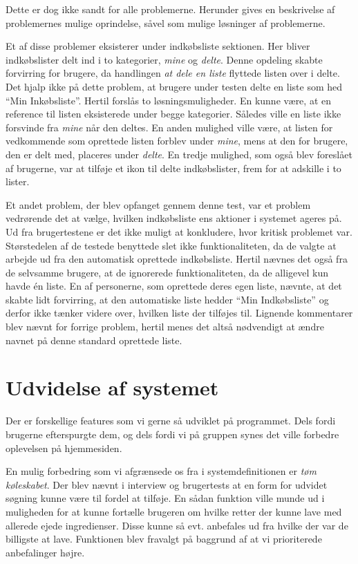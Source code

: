 Dette er dog ikke sandt for alle problemerne.
Herunder gives en beskrivelse af problemernes mulige oprindelse, såvel som mulige løsninger af problemerne.

Et af disse problemer eksisterer under indkøbsliste sektionen.
Her bliver indkøbslister delt ind i to kategorier, \textit{mine} og \textit{delte}.
Denne opdeling skabte forvirring for brugere, da handlingen \textit{at dele en liste} flyttede listen over i delte.
Det hjalp ikke på dette problem, at brugere under testen delte en liste som hed ``Min Inkøbsliste''.
Hertil forslås to løsningsmuligheder. 
En kunne være, at en reference til listen eksisterede under begge kategorier. 
Således ville en liste ikke forsvinde fra \textit{mine} når den deltes.
En anden mulighed ville være, at listen for vedkommende som oprettede listen forblev under \textit{mine}, mens at den for brugere, den er delt med, placeres under \textit{delte}.
En tredje mulighed, som også blev foreslået af brugerne, var at tilføje et ikon til delte indkøbslister, frem for at adskille i to lister.

Et andet problem, der blev opfanget gennem denne test, var et problem vedrørende det at vælge, hvilken indkøbsliste ens aktioner i systemet ageres på.
Ud fra brugertestene er det ikke muligt at konkludere, hvor kritisk problemet var.
Størstedelen af de testede benyttede slet ikke funktionaliteten, da de valgte at arbejde ud fra den automatisk oprettede indkøbsliste.
Hertil nævnes det også fra de selvsamme brugere, at de ignorerede funktionaliteten, da de alligevel kun havde én liste.
En af personerne, som oprettede deres egen liste, nævnte, at det skabte lidt forvirring, at den automatiske liste hedder ``Min Indkøbsliste'' og derfor ikke tænker videre over, hvilken liste der tilføjes til.
Lignende kommentarer blev nævnt for forrige problem, hertil menes det altså nødvendigt at ændre navnet på denne standard oprettede liste.

\section{Udvidelse af systemet}\label{udvidelse}
Der er forskellige features som vi gerne så udviklet på programmet. Dels fordi brugerne efterspurgte dem, og dels fordi vi på gruppen synes det ville forbedre oplevelsen på hjemmesiden.

En mulig forbedring som vi afgrænsede os fra i systemdefinitionen er \textit{tøm køleskabet}.
Der blev nævnt i interview og brugertests at en form for udvidet søgning kunne være til fordel at tilføje.
En sådan funktion ville munde ud i muligheden for at kunne fortælle brugeren om hvilke retter der kunne lave med allerede ejede ingredienser.
Disse kunne så evt. anbefales ud fra hvilke der var de billigste at lave.
Funktionen blev fravalgt på baggrund af at vi prioriterede anbefalinger højre.


